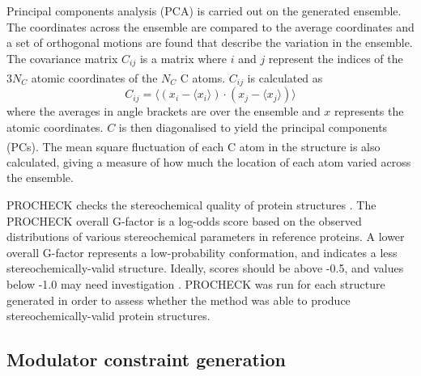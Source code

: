 Principal components analysis (PCA) is carried out on the generated ensemble.
The coordinates across the ensemble are compared to the average coordinates and a set of orthogonal motions are found that describe the variation in the ensemble.
The covariance matrix $C_{ij}$ is a matrix where $i$ and $j$ represent the indices of the $3 N_{C}$ atomic coordinates of the $N_{C}$ C\textsuperscript{\textalpha} atoms.
$C_{ij}$ is calculated as
$$
C_{ij} = \langle (x_{i} - \langle x_{i} \rangle) \cdot (x_{j} - \langle x_{j} \rangle) \rangle
$$
where the averages in angle brackets are over the ensemble and $x$ represents the atomic coordinates.
$C$ is then diagonalised to yield the principal components (PCs).
The mean square fluctuation of each C\textsuperscript{\textalpha} atom in the structure is also calculated, giving a measure of how much the location of each atom varied across the ensemble.

PROCHECK checks the stereochemical quality of protein structures \cite{Laskowski1993}.
The PROCHECK overall G-factor is a log-odds score based on the observed distributions of various stereochemical parameters in reference proteins.
A lower overall G-factor represents a low-probability conformation, and indicates a less stereochemically-valid structure.
Ideally, scores should be above -0.5, and values below -1.0 may need investigation \cite{Esposito2006}.
PROCHECK was run for each structure generated in order to assess whether the method was able to produce stereochemically-valid protein structures.


\subsection{Modulator constraint generation}

